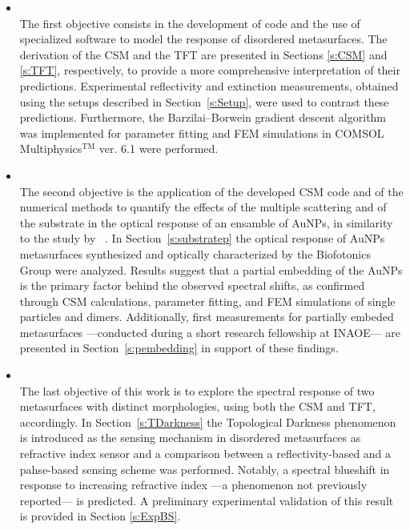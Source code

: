 \begin{itemize}
	\renewcommand\labelitemi{\textcolor{pblueFC}{$\blacktriangleright$}}
	\item {}\\
	 The first objective consists in the development of code and the use of specialized software to model the response of disordered metasurfaces. The derivation of the CSM and the TFT are presented in Sections \ref{s:CSM} and \ref{s:TFT}, respectively, to provide a more comprehensive interpretation of their predictions. Experimental reflectivity and extinction measurements, obtained using the setups described in Section~\ref{s:Setup}, were used to contrast these predictions. Furthermore, the Barzilai–Borwein gradient descent algorithm \cite{barzilai_two-point_1988} was implemented for parameter fitting and FEM simulations in COMSOL Multiphysics$^\text{TM}$ ver. 6.1 were performed.
%	
	\item {}\\
	The second objective is the application of the developed CSM code and of the numerical methods to quantify the effects of the multiple scattering and of the substrate in the optical response of an ensamble of AuNPs, in similarity to the study by \citeauthor*{borah_plasmon_2022}~\cite{borah_plasmon_2022}. In Section~\ref{s:substratep} the optical response of AuNPs metasurfaces synthesized and optically characterized by the Biofotonics Group were analyzed. Results suggest that a  partial  embedding of the AuNPs is the primary factor behind the observed spectral shifts, as confirmed through CSM calculations, parameter fitting, and FEM simulations of single particles and dimers. Additionally, first measurements for partially embeded metasurfaces ---conducted during a short research fellowship at INAOE--- are presented in Section~\ref{s:pembedding} in support of these findings. 
%	
	\item {}\\
	The last  objective of this work is to explore the spectral response of two metasurfaces with distinct morphologies, using both the CSM and TFT, accordingly. In Section~\ref{s:TDarkness} the Topological Darkness phenomenon \cite{ermolaev_topological_2022} is introduced as the sensing mechanism in disordered metasurfaces as refractive index sensor  and a comparison between a reflectivity-based and a pahse-based sensing scheme was performed. Notably, a spectral blueshift in response to increasing refractive index ---a phenomenon not previously reported--- is predicted. A preliminary experimental validation of this result is provided in Section \ref{s:ExpBS}.
\end{itemize}